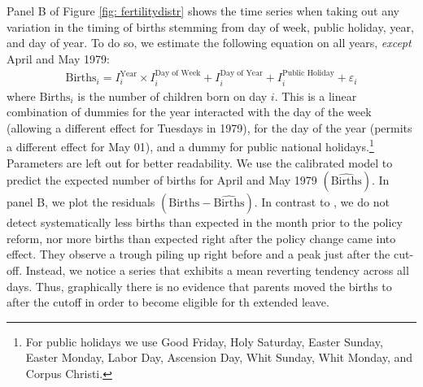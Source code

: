 \documentclass[11pt, a4paper]{article} %
\begin{document}
Panel B of Figure \ref{fig: fertilitydistr} shows the time series when taking out any variation in the timing of births stemming from day of week, public holiday, year, and day of year. To do so, we estimate the following equation on all years, \emph{except} April and May 1979:
\begin{align}
\text{Births}_i = I^{\text{Year}}_i\times I^{\text{Day of Week}}_i + I^{\text{Day of Year}}_i + I^{\text{Public Holiday}}_i + \varepsilon_i \label{eq: validity_fig}
\end{align}
where $\text{Births}_i$ is the number of children born on day $i$. This is a linear combination of dummies for the year interacted with the day of the week (allowing a different effect for Tuesdays in 1979), for the day of the year (permits a different effect for May 01), and a dummy for public national holidays.\footnote{For public holidays we use Good Friday, Holy Saturday, Easter Sunday, Easter Monday, Labor Day, Ascension Day, Whit Sunday, Whit Monday, and Corpus Christi.} Parameters are left out for better readability. \newline We use the calibrated model to predict the expected number of births for April and May 1979 $(\widehat{\text{Births}})$. In panel B, we plot the residuals $(\text{Births}-\widehat{\text{Births}})$. In contrast to \cite{gans2009born}, we do not detect systematically less births than expected in the month prior to the policy reform, nor more births than expected right after the policy change came into effect. They observe a trough piling up right before and a peak just after the cut-off. Instead, we notice a series that exhibits a mean reverting tendency across all days. Thus, graphically there is no evidence that parents moved the births to after the cutoff in order to become eligible for th extended leave. \newline 
\end{document}
